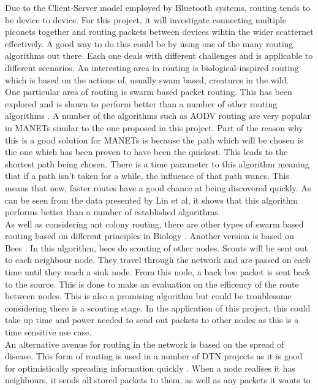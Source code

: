 \documentclass{report}
\begin{document}
Due to the Client-Server model employed by Bluetooth systems, routing tends to be device to device. For this project, it will investigate connecting multiple piconets together 
and routing packets between devices wihtin the wider scatternet effectively. A good way to do this could be by using one of the many routing algorithms out there. Each one deals 
with different challenges and is applicable to different scenarios. An interesting area in routing is biological-inspired routing which is based on the actions of, usually 
swam based, creatures in the wild.
\bigskip\\
One particular area of routing is swarm based packet routing. This has been explored and is shown to perform better than a number of other routing algorithms \cite{lin2014performance}. 
A number of the algorithms such as AODV routing are very popular in MANETs similar to the one proposed in this project. Part of the reason why this is a good solution for MANETs is 
because the path which will be chosen is the one which has been proven to have been the quickest. This leads to the shortest path being chosen. There is a time parameter to 
this algorithm meaning that if a path isn't taken for a while, the influence of that path wanes. This means that new, faster routes have a good chance at being discovered quickly.
As can be seen from the data presented by Lin et al, it shows that this algorithm performs better than a number of established algorithms.
\bigskip\\
As well as considering ant colony routing, there are other types of swarm based routing based on different principles in Biology \cite{sharvani2009different}. Another version is based on Bees \cite{leonov2016modeling}. 
In this algorithm, bees do scouting of other nodes. Scouts will be sent out to each neighbour node. They travel through the network and are passed on each time until they reach a sink node. 
From this node, a back bee packet is sent back to the source. This is done to make an evaluation on the efficency of the route between nodes. This is also a promising algorithm but 
could be troublesome considering there is a scouting stage. In the application of this project, this could take up time and power needed to send out packets to other nodes as 
this is a time sensitive use case. 
\bigskip\\
An alternative avenue for routing in the network is based on the spread of disease. This form of routing is used in a number of DTN projects as it is good for optimistically 
spreading information quickly \cite{choksatid2016efficient}. When a node realises it has neighbours, it sends all stored packets to them, as well as any packets it wants to 
\end{document}
